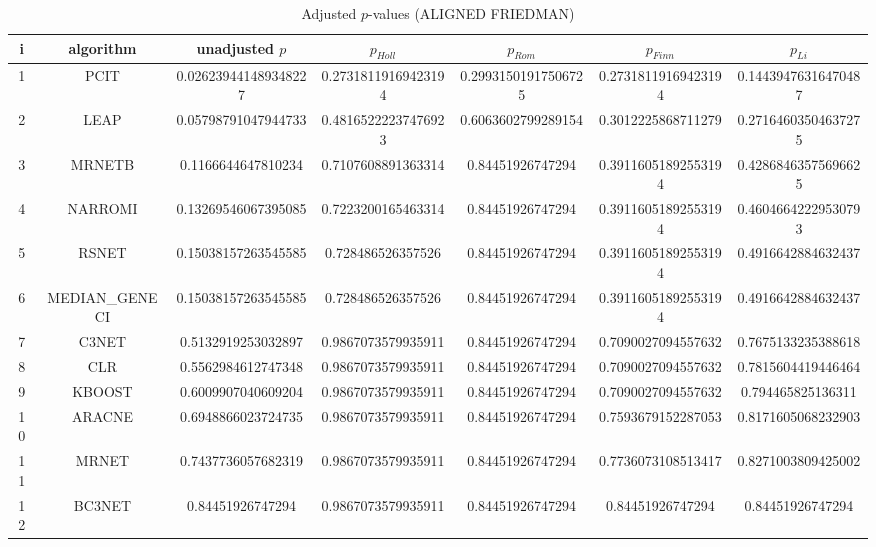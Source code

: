 \documentclass[a4paper,10pt]{article}
\begin{document}
\begin{landscape}
\begin{table}[!htp]
\centering\scriptsize
\caption{Adjusted $p$-values (ALIGNED FRIEDMAN)}
\begin{tabular}{ccccccc}
i&algorithm&unadjusted $p$&$p_{Holl}$&$p_{Rom}$&$p_{Finn}$&$p_{Li}$\\
\hline
1&PCIT&0.026239441489348227&0.27318119169423194&0.29931501917506725&0.27318119169423194&0.14439476316470487\\
2&LEAP&0.05798791047944733&0.48165222237476923&0.6063602799289154&0.3012225868711279&0.27164603504637275\\
3&MRNETB&0.1166644647810234&0.7107608891363314&0.84451926747294&0.39116051892553194&0.42868463575696625\\
4&NARROMI&0.13269546067395085&0.7223200165463314&0.84451926747294&0.39116051892553194&0.46046642229530793\\
5&RSNET&0.15038157263545585&0.728486526357526&0.84451926747294&0.39116051892553194&0.4916642884632437\\
6&MEDIAN_GENECI&0.15038157263545585&0.728486526357526&0.84451926747294&0.39116051892553194&0.4916642884632437\\
7&C3NET&0.5132919253032897&0.9867073579935911&0.84451926747294&0.7090027094557632&0.7675133235388618\\
8&CLR&0.5562984612747348&0.9867073579935911&0.84451926747294&0.7090027094557632&0.7815604419446464\\
9&KBOOST&0.6009907040609204&0.9867073579935911&0.84451926747294&0.7090027094557632&0.794465825136311\\
10&ARACNE&0.6948866023724735&0.9867073579935911&0.84451926747294&0.7593679152287053&0.8171605068232903\\
11&MRNET&0.7437736057682319&0.9867073579935911&0.84451926747294&0.7736073108513417&0.8271003809425002\\
12&BC3NET&0.84451926747294&0.9867073579935911&0.84451926747294&0.84451926747294&0.84451926747294\\
\hline
\end{tabular}
\end{table}


\newpage


\end{landscape}
\end{document}
